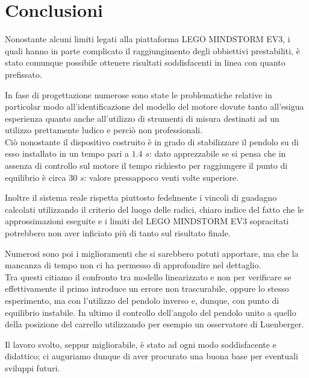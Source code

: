 \chapter{Conclusioni}
Nonostante alcuni limiti legati alla piattaforma LEGO MINDSTORM EV3, i quali hanno in parte complicato il raggiungimento degli obbiettivi prestabiliti, è stato comunque possibile ottenere risultati soddisfacenti in linea con quanto prefissato.

In fase di progettazione numerose sono state le problematiche relative in particolar modo all'identificazione del modello del motore dovute tanto all'esigua esperienza quanto anche all'utilizzo di strumenti di misura destinati ad un utilizzo prettamente ludico e perciò non professionali.\\
Ciò nonostante il dispositivo costruito è in grado di stabilizzare il pendolo su di esso installato in un tempo pari a $1.4$ $s$: dato apprezzabile se si pensa che in assenza di controllo sul motore il tempo richiesto per raggiungere il punto di equilibrio è circa $30$ $s$: valore pressappoco venti volte superiore.

Inoltre il sistema reale rispetta piuttosto fedelmente i vincoli di guadagno calcolati utilizzando il criterio del luogo delle radici, chiaro indice del fatto che le approssimazioni eseguite e i limiti del LEGO MINDSTORM EV3 sopracitati potrebbero non aver inficiato più di tanto sul risultato finale.

Numerosi sono poi i miglioramenti che si sarebbero potuti apportare, ma che la mancanza di tempo non ci ha permesso di approfondire nel dettaglio.\\
Tra questi citiamo il confronto tra modello linearizzato e non per verificare se effettivamente il primo introduce un errore non trascurabile, oppure lo stesso esperimento, ma con l'utilizzo del pendolo inverso e, dunque, con punto di equilibrio instabile. In ultimo il controllo dell'angolo del pendolo unito a quello della posizione del carrello utilizzando per esempio un osservatore di Luenberger.

Il lavoro svolto, seppur migliorabile, è stato ad ogni modo soddisfacente e didattico; ci auguriamo dunque di aver procurato una buona base per eventuali sviluppi futuri.



